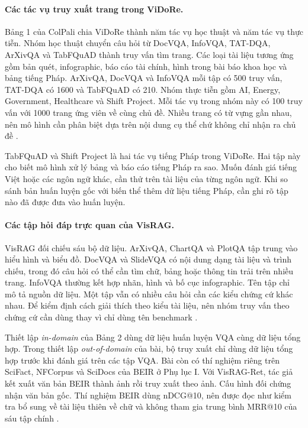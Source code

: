 \paragraph{Các tác vụ truy xuất trang trong ViDoRe.}
Bảng 1 của ColPali chia ViDoRe thành năm tác vụ học thuật và năm
tác vụ thực tiễn. Nhóm học thuật chuyển câu hỏi từ DocVQA, InfoVQA,
TAT-DQA, ArXivQA và TabFQuAD thành truy vấn tìm trang. Các loại tài
liệu tương ứng gồm bản quét, infographic, báo cáo tài chính, hình
trong bài báo khoa học và bảng tiếng Pháp. ArXivQA, DocVQA và InfoVQA
mỗi tập có 500 truy vấn,
TAT-DQA có 1600 và TabFQuAD có 210. Nhóm thực tiễn gồm AI, Energy,
Government, Healthcare và Shift Project. Mỗi tác vụ trong nhóm
này có 100 truy vấn với 1000 trang ứng viên về cùng chủ đề. Nhiều
trang có từ vựng gần nhau, nên mô hình cần phân biệt dựa trên nội
dung cụ thể chứ không chỉ nhận ra chủ đề \cite{faysse2025colpali}.

TabFQuAD và Shift Project là hai tác vụ tiếng Pháp trong ViDoRe.
Hai tập này cho biết mô hình xử lý bảng và báo cáo tiếng Pháp ra
sao. Muốn đánh giá tiếng Việt hoặc các ngôn ngữ khác, cần thử trên
tài liệu của từng ngôn ngữ. Khi so
sánh bản huấn luyện gốc với biến thể thêm dữ liệu tiếng Pháp,
cần ghi rõ tập nào đã được đưa vào huấn luyện.

\paragraph{Các tập hỏi đáp trực quan của VisRAG.}
VisRAG đối chiếu sáu bộ dữ liệu. ArXivQA, ChartQA và PlotQA tập trung
vào hiểu hình và biểu đồ. DocVQA và SlideVQA có nội dung dạng
tài liệu và trình chiếu, trong đó câu hỏi có thể cần tìm chữ,
bảng hoặc thông tin trải trên nhiều trang. InfoVQA thường kết
hợp nhãn, hình và bố cục infographic. Tên tập chỉ mô tả nguồn
dữ liệu. Một tập vẫn có nhiều câu hỏi cần các kiểu chứng cứ khác
nhau. Để kiểm định cách giải thích theo kiểu tài liệu, nên nhóm
truy vấn theo chứng cứ cần dùng thay vì chỉ dùng tên benchmark
\cite{yu2025visrag}.

Thiết lập \textit{in-domain} của Bảng 2 dùng dữ liệu huấn luyện
VQA cùng dữ liệu tổng hợp. Trong thiết lập \textit{out-of-domain}
của bài, bộ truy xuất chỉ dùng dữ liệu tổng hợp trước khi đánh
giá trên các tập VQA. Bài còn có thí nghiệm riêng trên SciFact,
NFCorpus và SciDocs của BEIR ở Phụ lục I. Với VisRAG-Ret, tác
giả kết xuất văn bản BEIR thành ảnh rồi truy xuất theo ảnh.
Cấu hình đối chứng nhận văn bản gốc. Thí nghiệm BEIR dùng
nDCG@10, nên được đọc như kiểm tra bổ sung về tài liệu thiên về
chữ và không tham gia trung bình MRR@10 của sáu tập chính
\cite{yu2025visrag}.

